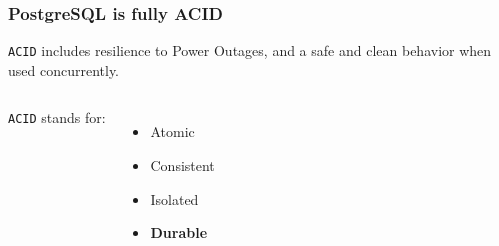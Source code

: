 \documentclass{beamer}
\begin{document}
{
  \begin{frame}

    \frametitle{PostgreSQL is fully ACID}

    \texttt{ACID} includes resilience to Power Outages, and a safe and clean
    behavior when used concurrently.
    
    \vfill

    \begin{columns}[c]
      \texttt{ACID} stands for:
      \begin{itemize}
      \item Atomic
      \item Consistent
      \item Isolated
      \item \textbf{Durable}
      \end{itemize}
    \end{columns}
  \end{frame}
}

{
  \begin{frame}[plain]
  \end{frame}
}
\end{document}
